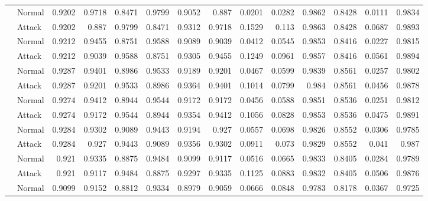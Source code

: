 \begin{tabular}{llrrrrrrrrrrrr}
                & Normal     &     0.9202 &      0.9718 &   0.8471 &        0.9799 &     0.9052 & 0.887  & 0.0201 & 0.0282 &    0.9862 & 0.8428 & 0.0111 &   0.9834 \\
                & Attack     &     0.9202 &      0.887  &   0.9799 &        0.8471 &     0.9312 & 0.9718 & 0.1529 & 0.113  &    0.9863 & 0.8428 & 0.0687 &   0.9893 \\
                & Normal     &     0.9212 &      0.9455 &   0.8751 &        0.9588 &     0.9089 & 0.9039 & 0.0412 & 0.0545 &    0.9853 & 0.8416 & 0.0227 &   0.9815 \\
                & Attack     &     0.9212 &      0.9039 &   0.9588 &        0.8751 &     0.9305 & 0.9455 & 0.1249 & 0.0961 &    0.9857 & 0.8416 & 0.0561 &   0.9894 \\
                & Normal     &     0.9287 &      0.9401 &   0.8986 &        0.9533 &     0.9189 & 0.9201 & 0.0467 & 0.0599 &    0.9839 & 0.8561 & 0.0257 &   0.9802 \\
                & Attack     &     0.9287 &      0.9201 &   0.9533 &        0.8986 &     0.9364 & 0.9401 & 0.1014 & 0.0799 &    0.984  & 0.8561 & 0.0456 &   0.9878 \\
                & Normal     &     0.9274 &      0.9412 &   0.8944 &        0.9544 &     0.9172 & 0.9172 & 0.0456 & 0.0588 &    0.9851 & 0.8536 & 0.0251 &   0.9812 \\
                & Attack     &     0.9274 &      0.9172 &   0.9544 &        0.8944 &     0.9354 & 0.9412 & 0.1056 & 0.0828 &    0.9853 & 0.8536 & 0.0475 &   0.9891 \\
                & Normal     &     0.9284 &      0.9302 &   0.9089 &        0.9443 &     0.9194 & 0.927  & 0.0557 & 0.0698 &    0.9826 & 0.8552 & 0.0306 &   0.9785 \\
                & Attack     &     0.9284 &      0.927  &   0.9443 &        0.9089 &     0.9356 & 0.9302 & 0.0911 & 0.073  &    0.9829 & 0.8552 & 0.041  &   0.987  \\
                & Normal     &     0.921  &      0.9335 &   0.8875 &        0.9484 &     0.9099 & 0.9117 & 0.0516 & 0.0665 &    0.9833 & 0.8405 & 0.0284 &   0.9789 \\
                & Attack     &     0.921  &      0.9117 &   0.9484 &        0.8875 &     0.9297 & 0.9335 & 0.1125 & 0.0883 &    0.9832 & 0.8405 & 0.0506 &   0.9876 \\
                & Normal     &     0.9099 &      0.9152 &   0.8812 &        0.9334 &     0.8979 & 0.9059 & 0.0666 & 0.0848 &    0.9783 & 0.8178 & 0.0367 &   0.9725 \\

\end{tabular}
